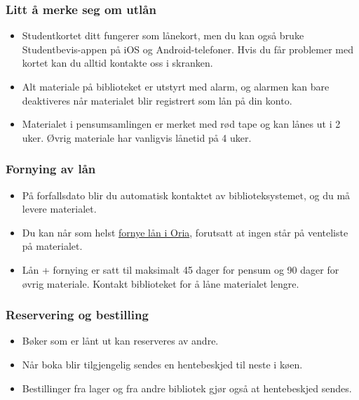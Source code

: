 \begin{frame}
  \frametitle{Litt å merke seg om utlån}

  \begin{itemize}
  \item Studentkortet ditt fungerer som lånekort, men du kan også bruke \alert{Studentbevis-appen} på iOS og Android-telefoner. Hvis du får problemer med kortet kan du alltid kontakte oss i skranken.
  \item Alt materiale på biblioteket er utstyrt med \alert{alarm}, og alarmen kan bare deaktiveres når materialet blir registrert som lån på din konto.
  \item Materialet i pensumsamlingen er merket med rød tape og kan lånes ut i 2 uker. Øvrig materiale har vanligvis lånetid på 4 uker.
  \end{itemize}
\end{frame}

\begin{frame}
  \frametitle{Fornying av lån}

  \begin{itemize}
  \item På forfallsdato blir du automatisk kontaktet av biblioteksystemet, og du må levere materialet.
  \item Du kan når som helst \href{https://bibsys-almaprimo.hosted.exlibrisgroup.com/primo_library/libweb/action/login.do?loginFn=signin&vid=DMMH&targetURL=https://bibsys-almaprimo.hosted.exlibrisgroup.com/primo_library/libweb/action/myAccountMenu.do?vid=DMMH&fromLink=gotoMyAccountUI}{fornye lån i Oria}, forutsatt at ingen står på venteliste på materialet.
  \item Lån + fornying er satt til maksimalt 45 dager for pensum og 90 dager for øvrig materiale. Kontakt biblioteket for å låne materialet lengre.
  \end{itemize}
\end{frame}

\begin{frame}
  \frametitle{Reservering og bestilling}

  \begin{itemize}
  \item Bøker som er lånt ut kan reserveres av andre.
  \item Når boka blir tilgjengelig sendes en hentebeskjed til neste i køen.
  \item Bestillinger fra lager og fra andre bibliotek gjør også at hentebeskjed sendes.
  \end{itemize}
\end{frame}

